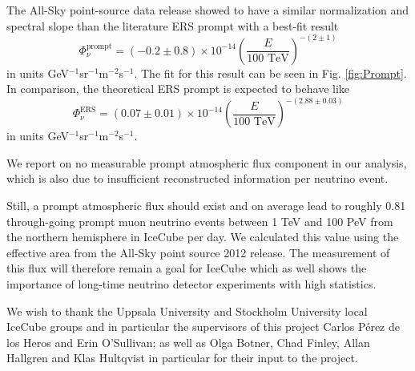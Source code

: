 \documentclass[%
 reprint,
 preprintnumbers,
 nofootinbib,
 amsmath,amssymb,
 aps,
]{revtex4-2}
\begin{document}
The All-Sky point-source data release showed to have a similar normalization and spectral slope than the literature ERS prompt \cite{pertcharm} with a best-fit result
\begin{equation}
    \Phi^\text{prompt}_\nu = \left( -0.2 \pm 0.8 \right)\times 10^{-14} \left( \frac{E}{100\text{ TeV}}\right)^{-(2 \pm 1)}
\end{equation}
in units GeV$^{-1}$sr$^{-1}$m$^{-2}$s$^{-1}$. The fit for this result can be seen in Fig. \ref{fig:Prompt}. In comparison, the theoretical ERS prompt is expected to behave like
\begin{equation}
    \Phi^\text{ERS}_\nu = \left( 0.07 \pm 0.01 \right)\times 10^{-14} \left( \frac{E}{100\text{ TeV}}\right)^{-(2.88 \pm 0.03)}
\end{equation}
in units GeV$^{-1}$sr$^{-1}$m$^{-2}$s$^{-1}$.

We report on no measurable prompt atmospheric flux component in our analysis, which is also due to insufficient reconstructed information per neutrino event.

Still, a prompt atmospheric flux should exist and on average lead to roughly 0.81 through-going prompt muon neutrino events between 1 TeV and 100 PeV from the northern hemisphere in IceCube per day. We calculated this value using the effective area from the All-Sky point source 2012 release. The measurement of this flux will therefore remain a goal for IceCube which as well shows the importance of long-time neutrino detector experiments with high statistics.

\begin{acknowledgments}
We wish to thank the Uppsala University and Stockholm University local IceCube groups and in particular the supervisors of this project Carlos  P\'erez  de  los  Heros  and  Erin  O’Sullivan; as well as Olga Botner, Chad Finley, Allan Hallgren and Klas Hultqvist in particular for their input to the project.
\end{acknowledgments}

\appendix



\nocite{*}


\end{document}
